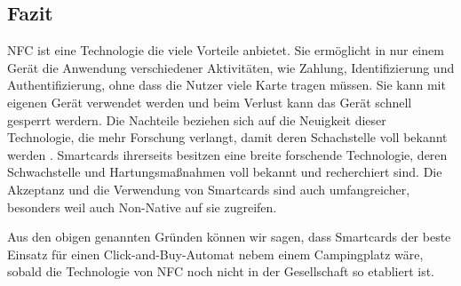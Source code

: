 
\subsection{Fazit}

NFC ist eine Technologie die viele Vorteile anbietet. Sie ermöglicht in nur einem Gerät die Anwendung verschiedener
Aktivitäten, wie Zahlung, Identifizierung und Authentifizierung, ohne dass die Nutzer viele Karte tragen müssen.
Sie kann mit eigenen Gerät verwendet werden und beim Verlust kann das Gerät schnell gesperrt werdern. Die Nachteile
beziehen sich auf die Neuigkeit dieser Technologie, die mehr Forschung verlangt, damit deren Schachstelle voll bekannt
werden \cite{refart:ALSI}. Smartcards ihrerseits besitzen eine breite forschende Technologie, deren Schwachstelle und
Hartungsmaßnahmen voll bekannt und recherchiert sind. Die Akzeptanz und die Verwendung von Smartcards sind auch
umfangreicher, besonders weil auch Non-Native auf sie zugreifen.

Aus den obigen genannten Gründen können wir sagen, dass Smartcards der beste Einsatz für einen Click-and-Buy-Automat
nebem einem Campingplatz wäre, sobald die Technologie von NFC noch nicht in der Gesellschaft so etabliert ist.
